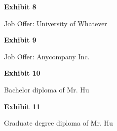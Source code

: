 \documentclass{article}
\begin{document}
% 




\vspace*{\fill}
\begin{center}

{\LARGE \bf
Exhibit 8
}

\vspace{10\baselineskip}

{\large Job Offer: University of Whatever}

\end{center}
\vspace*{\fill}


% 


\vspace*{\fill}
\begin{center}

{\LARGE \bf
Exhibit 9
}

\vspace{10\baselineskip}

{\large Job Offer: Anycompany Inc.}

\end{center}
\vspace*{\fill}

% 




\vspace*{\fill}
\begin{center}

{\LARGE \bf
Exhibit 10
}

\vspace{10\baselineskip}

{\large Bachelor diploma of Mr. Hu}

\end{center}
\vspace*{\fill}

% 

% 


\vspace*{\fill}
\begin{center}

{\LARGE \bf
Exhibit 11
}

\vspace{10\baselineskip}

{\large Graduate degree diploma of Mr. Hu}

\end{center}
\vspace*{\fill}
\end{document}
